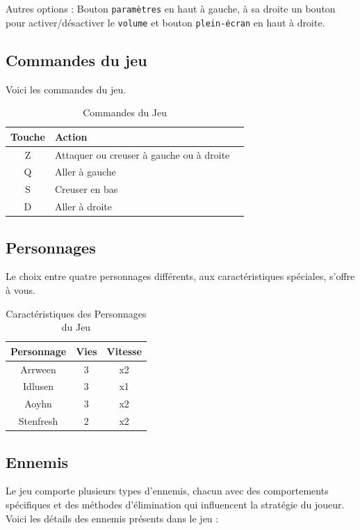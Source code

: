 \documentclass[a4paper,12pt]{article}
\begin{document}
Autres options : Bouton \texttt{paramètres} en haut à gauche, à sa droite un bouton pour activer/désactiver le \texttt{volume} et bouton \texttt{plein-écran} en haut à droite.

\subsection{Commandes du jeu}
Voici les commandes du jeu.
\begin{table}[h]
\centering
\label{tab:commandes_jeu}
\begin{tabular}{@{}clc@{}} %
\toprule %
\textbf{Touche} & \textbf{Action} \\
\midrule %
Z & Attaquer ou creuser à gauche ou à droite \\
Q & Aller à gauche \\
S & Creuser en bas \\
D & Aller à droite \\
\bottomrule %
\end{tabular}
\caption{Commandes du Jeu}
\end{table}

\subsection{Personnages}
Le choix entre quatre personnages différents, aux caractéristiques spéciales, s'offre à vous.
\begin{table}[h]
\centering

\label{tab:personnages}
\begin{tabular}{|c|c|c|}
\hline
\textbf{Personnage} & \textbf{Vies} & \textbf{Vitesse} \\ \hline
Arrween    & 3 & x2 \\ \hline
Idlusen    & 3 & x1 \\ \hline
Aoyhn      & 3 & x2 \\ \hline
Stenfresh  & 2 & x2 \\ \hline
\end{tabular}
\caption{Caractéristiques des Personnages du Jeu}
\end{table}

\subsection{Ennemis}

Le jeu comporte plusieurs types d'ennemis, chacun avec des comportements spécifiques et des méthodes d'élimination qui influencent la stratégie du joueur. Voici les détails des ennemis présents dans le jeu :
\end{document}
